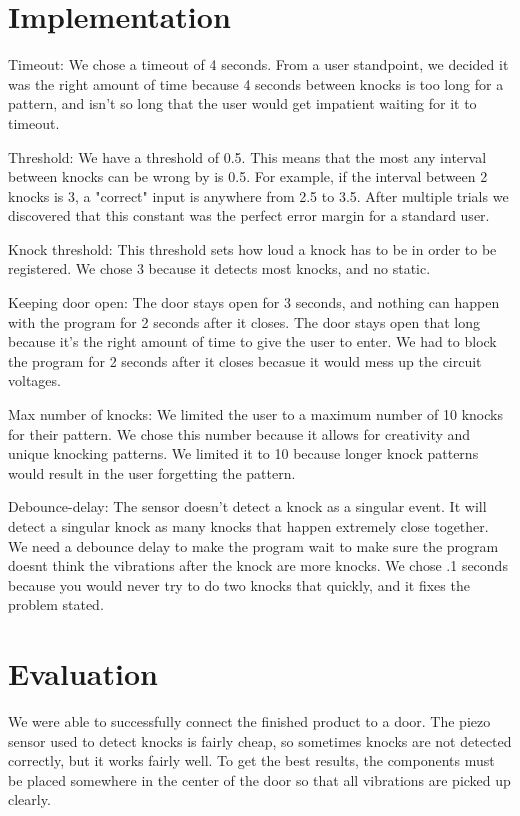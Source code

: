 \documentclass[11pt]{article}			%
\begin{document}
\section{Implementation}
Timeout: We chose a timeout of 4 seconds. From a user standpoint, we decided it was the right amount of time because 4 seconds between knocks is too long for a pattern, and isn't so long that the user would get impatient waiting for it to timeout.

Threshold: We have a threshold of 0.5. This means that the most any interval between knocks can be wrong by is 0.5. For example, if the interval between 2 knocks is 3, a "correct" input is anywhere from 2.5 to 3.5. After multiple trials we discovered that this constant was the perfect error margin for a standard user.

Knock threshold: This threshold sets how loud a knock has to be in order to be registered. We chose 3 because it detects most knocks, and no static.

Keeping door open: The door stays open for 3 seconds, and nothing can happen with the program for 2 seconds after it closes. The door stays open that long because it's the right amount of time to give the user to enter. We had to block the program for 2 seconds after it closes becasue it would mess up the circuit voltages.

Max number of knocks: We limited the user to a maximum number of 10 knocks for their pattern. We chose this number because it allows for creativity and unique knocking patterns. We limited it to 10 because longer knock patterns would result in the user forgetting the pattern.

Debounce-delay: The sensor doesn't detect a knock as a singular event. It will detect a singular knock as many knocks that happen 
extremely close together. We need a debounce delay to make the program wait to make sure the program doesnt think the vibrations after the knock are more knocks. We chose .1 seconds because you would never try to do two knocks that quickly, and it fixes the problem stated.


\section{Evaluation}
We were able to successfully connect the finished product to a door.  The piezo sensor used to detect knocks is fairly cheap, so sometimes knocks are not detected correctly, but it works fairly well.  To get the best results, the components must be placed somewhere in the center of the door so that all vibrations are picked up clearly.  
\end{document}
